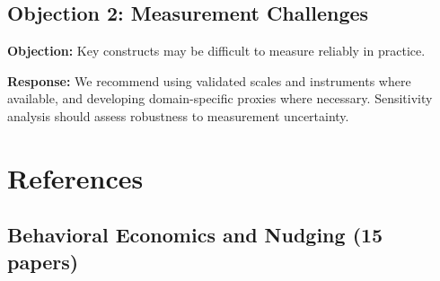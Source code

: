 \subsection{Objection 2: Measurement Challenges}

\textbf{Objection:} Key constructs may be difficult to measure reliably in
practice.

\textbf{Response:} We recommend using validated scales and instruments where
available, and developing domain-specific proxies where necessary. Sensitivity
analysis should assess robustness to measurement uncertainty.


\section{References}

\nocite{bcm_master}

\label{sec:references-ebf}

\subsection{Behavioral Economics and Nudging (15 papers)}

